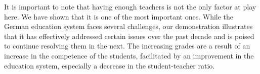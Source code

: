 It is important to note that having enough teachers is not the only factor at play here. We have shown that it is one of the most important ones. While the German education system faces several challenges, our demonstration illustrates that it has effectively addressed certain issues over the past decade and is poised to continue resolving them in the next. The increasing grades are a result of an increase in the competence of the students, facilitated by an improvement in the education system, especially a decrease in the student-teacher ratio.

